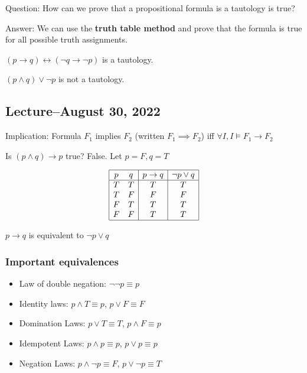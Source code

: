 \documentclass{scrreprt}
\begin{document}
Question: How can we prove that a propositional formula is a tautology is true?

Answer: We can use the \textbf{truth table method} and prove that the formula is true for all possible truth assignments.

\begin{example}[Tautology]
	$(p\rightarrow q)\leftrightarrow (\neg q \rightarrow \neg p)$ is a tautology.

	$(p\land q)\lor \neg p$ is not a tautology.
\end{example}

\subsection{Lecture--August 30, 2022}

Implication: Formula $F_1$ implies $F_2$ (written $F_1\implies F_2$) iff
$\forall I, I\models F_1\rightarrow F_2$

\begin{example}
	Is $(p\land q)\rightarrow p$ true? False. Let $p=F, q=T$

	\[
		\begin{array}{|c c|c|c|}
			\hline
			p & q & p\rightarrow q & \neg p \lor q \\
			\hline
			T & T & T              & T             \\
			T & F & F              & F             \\
			F & T & T              & T             \\
			F & F & T              & T             \\
			\hline
		\end{array}
	\]
\end{example}

\begin{definition}
	$p\rightarrow q$ is equivalent to $\neg p\lor q$
\end{definition}

\subsubsection{Important equivalences}

\begin{itemize}
	\item Law of double negation: $\neg \neg p \equiv p$
	\item Identity laws: $p\land T \equiv p$, $p\lor F \equiv F$
	\item Domination Laws: $p\lor T \equiv T$, $p\land F \equiv p$
	\item Idempotent Laws: $p\land p \equiv p$, $p\lor p \equiv p$
	\item Negation Laws: $p\land \neg p\equiv F$, $p\lor \neg p \equiv T$
\end{itemize}
\end{document}
